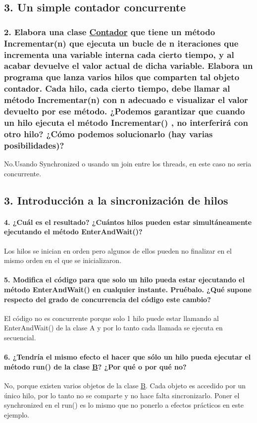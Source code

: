 \subsection*{3. Un simple contador concurrente}

\subsubsection*{2. Elabora una clase \hyperlink{classContador}{Contador} que tiene un método Incrementar(n) que ejecuta un bucle de n iteraciones que incrementa una variable interna cada cierto tiempo, y al acabar devuelve el valor actual de dicha variable. Elabora un programa que lanza varios hilos que comparten tal objeto contador. Cada hilo, cada cierto tiempo, debe llamar al método Incrementar(n) con n adecuado e visualizar el valor devuelto por ese método. ¿\-Podemos garantizar que cuando un hilo ejecuta el método Incrementar() , no interferirá con otro hilo? ¿\-Cómo podemos solucionarlo (hay varias posibilidades)?}

No.\-Usando Synchronized o usando un join entre los threads, en este caso no seria concurrente.

\subsection*{3. Introducción a la sincronización de hilos}

\paragraph*{4. ¿\-Cuál es el resultado? ¿\-Cuántos hilos pueden estar simultáneamente ejecutando el método Enter\-And\-Wait()?}

Los hilos se inician en orden pero algunos de ellos pueden no finalizar en el mismo orden en el que se inicializaron.

\paragraph*{5. Modifica el código para que solo un hilo pueda estar ejecutando el método Enter\-And\-Wait() en cualquier instante. Pruébalo. ¿\-Qué supone respecto del grado de concurrencia del código este cambio?}

El código no es concurrente porque solo 1 hilo puede estar llamando al Enter\-And\-Wait() de la clase A y por lo tanto cada llamada se ejecuta en secuencial.

\paragraph*{6. ¿\-Tendría el mismo efecto el hacer que sólo un hilo pueda ejecutar el método run() de la clase \hyperlink{classB}{B}? ¿\-Por qué o por qué no?}

No, porque existen varios objetos de la clase \hyperlink{classB}{B}. Cada objeto es accedido por un único hilo, por lo tanto no se comparte y no hace falta sincronizarlo. Poner el {\ttfamily synchronized} en el {\ttfamily run()} es lo mismo que no ponerlo a efectos prácticos en este ejemplo. 
